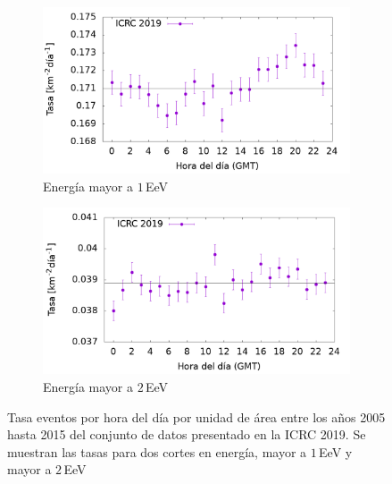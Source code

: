 			\begin{figure}[H]
    			\begin{subfigure}[b]{0.495\textwidth}
				\includegraphics[width=\textwidth]{../clima/Graphs/rate_hour_of_the_day/1EeV_ICRC_2019_05_19.png}
				\caption{Energía mayor a $1\,$EeV}
				\label{fig:rate_day_ICRC_19_05_18_2EeV}
    			\end{subfigure}%
    			\hspace{\fill}
    			\centering
    			\begin{subfigure}[b]{0.495\textwidth}
				\includegraphics[width=\textwidth]{../clima/Graphs/rate_hour_of_the_day/2EeV_ICRC_2019_05_18.png}
				\caption{Energía mayor a $2\,$EeV}
				\label{fig:rate_2015_ICRC_19_05_18_2EeV}
    			\end{subfigure}%
    			\caption{Tasa eventos  por hora del día por unidad de área entre los años 2005 hasta 2015 del conjunto de datos presentado en la ICRC 2019.  Se muestran las tasas para dos cortes en energía, mayor a $1\,$EeV y mayor a $2\,$EeV}\label{fig:rate_new_18_2EeV}
			\end{figure}


	
